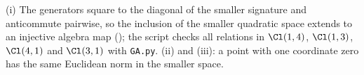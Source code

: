 (i) The generators square to the diagonal of the smaller signature and anticommute pairwise, so the inclusion of the smaller quadratic space extends to an injective algebra map (); the script checks all relations in $\Cl(1,4)$, $\Cl(1,3)$, $\Cl(4,1)$ and $\Cl(3,1)$ with \texttt{GA.py}. (ii) and (iii): a point with one coordinate zero has the same Euclidean norm in the smaller space.

